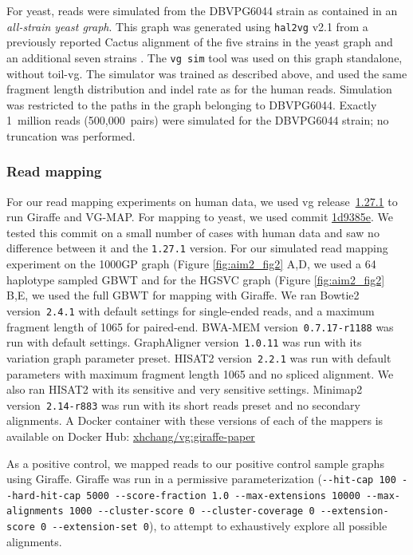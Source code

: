 \documentclass[11pt]{ucscthesis}
\newcommand{\vgcommit}[2]{\href{https://github.com/vgteam/vg/commit/#1}{#2}}
\newcommand{\vocab}[1]{\emph{#1}}
\begin{document}
For yeast, reads were simulated from the DBVPG6044 strain as contained in an \vocab{all-strain yeast graph}. 
This graph was generated using \texttt{hal2vg} v2.1 from a previously reported Cactus alignment of the five strains in the yeast graph and an additional seven strains \cite{hickey_vgsv_2020}.
The \texttt{vg~sim} tool was used on this graph standalone, without toil-vg.
The simulator was trained as described above, and used the same fragment length distribution and indel rate as for the human reads.
Simulation was restricted to the paths in the graph belonging to DBVPG6044.
Exactly 1~million reads (500,000~pairs) were simulated for the DBVPG6044 strain; no truncation was performed.


\subsubsection{Read mapping}
\label{subsec:aim2:readmapping}
For our read mapping experiments on human data, we used vg release~\vgcommit{6b7d2eeb618bb85c65438016a9eeccecfa0f6c82}{1.27.1} to run Giraffe and VG-MAP.
For mapping to yeast, we used commit \vgcommit{1d9385e1ca55689cd3ad251b6b2c23319d37be52}{1d9385e}.
We tested this commit on a small number of cases with human data and saw no difference between it and the \texttt{1.27.1} version.
For our simulated read mapping experiment on the 1000GP graph (Figure \ref{fig:aim2_fig2} A,D, we used a 64 haplotype sampled GBWT and for the HGSVC graph (Figure \ref{fig:aim2_fig2} B,E, we used the full GBWT for mapping with Giraffe.
We ran Bowtie2 version~\texttt{2.4.1} with default settings for single-ended reads, and a maximum fragment length of 1065 for paired-end.
BWA-MEM version~\texttt{0.7.17-r1188} was run with default settings.
GraphAligner version~\texttt{1.0.11} was run with its variation graph parameter preset.
HISAT2 version~\texttt{2.2.1} was run with default parameters with maximum fragment length 1065 and no spliced alignment.
We also ran HISAT2 with its sensitive and very sensitive settings.
Minimap2 version~\texttt{2.14-r883} was run with its short reads preset and no secondary alignments.
A Docker container with these versions of each of the mappers is available on Docker Hub: \href{https://hub.docker.com/layers/xhchang/vg/giraffe-paper/images/sha256-7dd5579b6cd3805c7d335803f2f646eada09f32159d1c534ab6c91c402627e33?context=explore}{xhchang/vg:giraffe-paper}

As a positive control, we mapped reads to our positive control sample graphs using Giraffe.
Giraffe was run in a permissive parameterization (\texttt{-{}-hit-cap 100 -{}-hard-hit-cap 5000 -{}-score-fraction 1.0 -{}-max-extensions 10000 -{}-max-alignments 1000 -{}-cluster-score 0 -{}-cluster-coverage 0 -{}-extension-score 0 -{}-extension-set 0}), to attempt to exhaustively explore all possible alignments.
\end{document}
